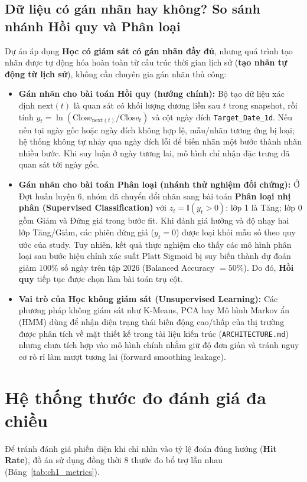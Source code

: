 \documentclass[12pt,a4paper]{report}
\begin{document}
\subsection{Dữ liệu có gán nhãn hay không? So sánh nhánh Hồi quy và Phân loại}
Dự án áp dụng \textbf{Học có giám sát có gán nhãn đầy đủ}, nhưng quá trình tạo nhãn được tự động hóa hoàn toàn từ cấu trúc thời gian lịch sử (\textbf{tạo nhãn tự động từ lịch sử}), không cần chuyên gia gán nhãn thủ công:
\begin{itemize}
    \item \textbf{Gán nhãn cho bài toán Hồi quy (hướng chính):} Bộ tạo dữ liệu xác định $\text{next}(t)$ là quan sát có khối lượng dương liền sau $t$ trong snapshot, rồi tính $y_t = \ln(\text{Close}_{\text{next}(t)}/\text{Close}_t)$ và cột ngày đích \nolinkurl{Target_Date_1d}. Nếu nến tại ngày gốc hoặc ngày đích không hợp lệ, mẫu/nhãn tương ứng bị loại; hệ thống không tự nhảy qua ngày đích lỗi để biến nhãn một bước thành nhãn nhiều bước. Khi suy luận ở ngày tương lai, mô hình chỉ nhận đặc trưng đã quan sát tới ngày gốc.
    \item \textbf{Gán nhãn cho bài toán Phân loại (nhánh thử nghiệm đối chứng):} Ở Đợt huấn luyện 6, nhóm đã chuyển đổi nhãn sang bài toán \textbf{Phân loại nhị phân (Supervised Classification)} với $z_t = \mathbb{I}(y_t > 0)$: lớp 1 là Tăng; lớp 0 gồm Giảm và Đứng giá trong bước fit. Khi đánh giá hướng và độ nhạy hai lớp Tăng/Giảm, các phiên đứng giá ($y_t = 0$) được loại khỏi mẫu số theo quy ước của study. Tuy nhiên, kết quả thực nghiệm cho thấy các mô hình phân loại sau bước hiệu chỉnh xác suất Platt Sigmoid bị suy biến thành dự đoán giảm $100\%$ số ngày trên tập 2026 (Balanced Accuracy $= 50\%$). Do đó, \textbf{Hồi quy} tiếp tục được chọn làm bài toán trụ cột.
    \item \textbf{Vai trò của Học không giám sát (Unsupervised Learning):} Các phương pháp không giám sát như K-Means, PCA hay Mô hình Markov ẩn (HMM) dùng để nhận diện trạng thái biến động cao/thấp của thị trường được phân tích về mặt thiết kế trong tài liệu kiến trúc (\nolinkurl{ARCHITECTURE.md}) nhưng chưa tích hợp vào mô hình chính nhằm giữ độ đơn giản và tránh nguy cơ rò rỉ làm mượt tương lai (forward smoothing leakage).
\end{itemize}

\section{Hệ thống thước đo đánh giá đa chiều}
Để tránh đánh giá phiến diện khi chỉ nhìn vào tỷ lệ đoán đúng hướng (\textbf{Hit Rate}), đồ án sử dụng đồng thời 8 thước đo bổ trợ lẫn nhau (Bảng~\ref{tab:ch1_metrics}).
\end{document}
